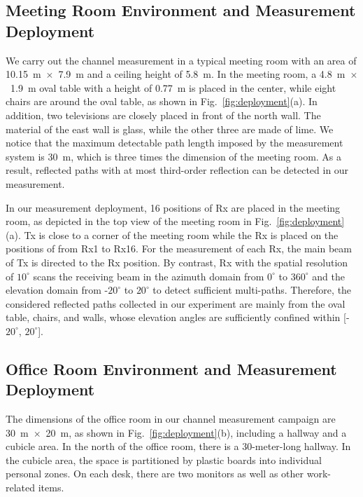 \documentclass[journal,12pt,draftclsnofoot,onecolumn]{IEEEtran}
\begin{document}


\subsection{Meeting Room Environment and Measurement Deployment}
We carry out the channel measurement in a typical meeting room with an area of 10.15~m~$\times$~7.9~m and a ceiling height of 5.8~m. In the meeting room, a 4.8~m~$\times$~1.9~m oval table with a height of 0.77~m is placed in the center, while eight chairs are around the oval table, as shown in Fig.~\ref{fig:deployment}(a). In addition, two televisions are closely placed in front of the north wall. The material of the east wall is glass, while the other three are made of lime. We notice that the maximum detectable path length imposed by the measurement system is 30~m, which is three times the dimension of the meeting room. As a result, reflected paths with at most third-order reflection can be detected in our measurement. 
\par  In our measurement deployment, 16 positions of Rx are placed in the meeting room, as depicted in the top view of the meeting room in Fig.~\ref{fig:deployment}(a). Tx is close to a corner of the meeting room while the Rx is placed on the positions of from Rx1 to Rx16. For the measurement of each Rx, the main beam of Tx is directed to the Rx position. By contrast, Rx with the spatial resolution of $10^\circ$ scans the receiving beam in the azimuth domain from $0^\circ$ to $360^\circ$ and the elevation domain from -$20^\circ$ to $20^\circ$ to detect sufficient multi-paths. Therefore, the considered reflected paths collected in our experiment are mainly from the oval table, chairs, and walls, whose elevation angles are sufficiently confined within [-$20^\circ$, $20^\circ$].


\subsection{Office Room Environment and Measurement Deployment}
The dimensions of the office room in our channel measurement campaign are 30~m~$\times$~20~m, as shown in Fig.~\ref{fig:deployment}(b), including a hallway and a cubicle area. In the north of the office room, there is a 30-meter-long hallway. In the cubicle area, the space is partitioned by plastic boards into individual personal zones. On each desk, there are two monitors as well as other work-related items. 
\end{document}
